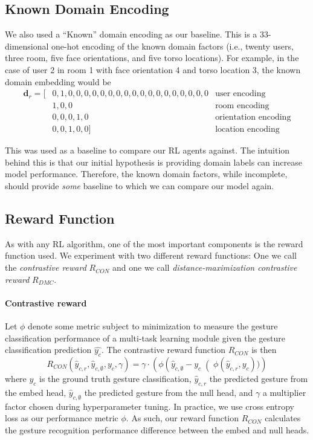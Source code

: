 \subsection{Known Domain Encoding}
We also used a ``Known'' domain encoding as our baseline.
This is a 33-dimensional one-hot encoding of the known domain factors (i.e., twenty users, three room, five face orientations, and five torso locations).
For example, in the case of user 2 in room 1 with face orientation 4 and torso location 3, the known domain embedding would be
\begin{align*}
	\boldsymbol{d}_r = [&0,1,0,0,0,0,0,0,0,0,0,0,0,0,0,0,0,0,0,0 & \text{user encoding} \\
	                    &1,0,0                                   & \text{room encoding} \\
	                    &0,0,0,1,0                               & \text{orientation encoding} \\
	                    &0,0,1,0,0]                              & \text{location encoding}
\end{align*}

This was used as a baseline to compare our RL agents against.
The intuition behind this is that our initial hypothesis is providing domain labels can increase model performance.
Therefore, the known domain factors, while incomplete, should provide \textit{some} baseline to which we can compare our model again.

\subsection{Reward Function}\label{subsec:methodology-reward}

As with any RL algorithm, one of the most important components is the reward function used.
We experiment with two different reward functions: One we call the \textit{contrastive reward} $R_{CON}$ and one we call \textit{distance-maximization contrastive reward} $R_{DMC}$.

\paragraph{Contrastive reward}
Let $\phi$ denote some metric subject to minimization to measure the gesture classification performance of a multi-task learning module given the gesture classification prediction $\hat{y_{c}}$.
The contrastive reward function $R_{CON}$ is then 
\begin{equation}
	R_{CON}(\hat{y}_{c,r}, \hat{y}_{c,\emptyset}, y_c, \gamma) = \gamma \cdot \left(\phi\left(\hat{y}_{c,\emptyset} - y_c\right(\phi\left(\hat{y}_{c,r}, y_c\right))\right)
\end{equation}
where $y_c$ is the ground truth gesture classification, $\hat{y}_{c,r} $ the predicted gesture from the embed head, $\hat{y}_{c,\emptyset}$ the predicted gesture from the null head, and $\gamma$ a multiplier factor chosen during hyperparameter tuning.
In practice, we use cross entropy loss as our performance metric $\phi$.
As such, our reward function $R_{CON}$ calculates the gesture recognition performance difference between the embed and null heads.

